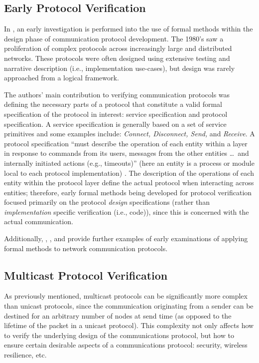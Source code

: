 \documentclass[10pt, journal]{IEEEtran}
\begin{document}
\subsection{Early Protocol Verification}
In \cite{Bochman1980}, an early investigation is performed into the use of formal methods within the design phase of communication protocol development. The 1980's saw a proliferation of complex protocols across increasingly large and distributed networks. These protocols were often designed using extensive testing and narrative description (i.e., implementation use-cases), but design was rarely approached from a logical framework. 

The authors' main contribution to verifying communication protocols was defining the necessary parts of a protocol that constitute a valid formal specification of the protocol in interest: service specification and protocol specification. A service specification is generally based on a set of service primitives and some examples include: \textit{Connect, Disconnect, Send,} and \textit{Receive}. A protocol specification ``must describe the operation of each entity within a layer in response to commands from its users, messages from the other entities \ldots\ and internally initiated actions (e.g., timeouts)'' (here an entity is a process or module local to each protocol implementation) \cite{Bochman1980}. The description of the operations of each entity within the protocol layer define the actual protocol when interacting across entities; therefore, early formal methods being developed for protocol verification focused primarily on the protocol \textit{design} specifications (rather than \textit{implementation} specific verification (i.e., code)), since this is concerned with the actual communication. 

Additionally, \cite{Holzmann1990}, \cite{Milner1989}, and \cite{Baptista1990} provide further examples of early examinations of applying formal methods to network communication protocols.

\subsection{Multicast Protocol Verification}
As previously mentioned, multicast protocols can be significantly more complex than unicast protocols, since the communication originating from a sender can be destined for an arbitrary number of nodes at send time (as opposed to the lifetime of the packet in a unicast protocol). This complexity not only affects how to verify the underlying design of the communications protocol, but how to ensure certain desirable aspects of a communications protocol: security, wireless resilience, etc.
\end{document}

